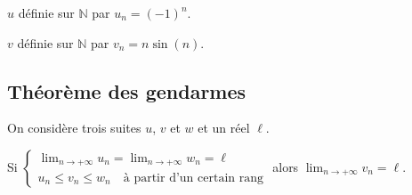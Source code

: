 \documentclass[french]{book}
\newcommand{\N}{\mathbb {N}}
\newcommand{\ie}{\leq}
\newcommand{\limn}{\lim_{n\rightarrow +\infty}}
\newcommand{\limpinf}[1][x]{\ds\lim_{#1\rightarrow +\infty}}
\begin{document}
\begin{exemple}
$u$ définie sur $\N$ par $u_{n}=(-1)^{n}$.

$v$ définie sur $\N$ par $v_{n}=n\sin(n)$.
\end{exemple}

\subsection{Théorème des gendarmes}

\begin{prop}
On considère trois suites $u$, $v$ et $w$ et un réel $\ell$.
\par Si \quad
$\left\{\begin{array}{l}
\limn u_{n}=\limn w_{n}=\ell \\
u_{n} \ie v_{n} \ie w_{n} \quad \text{à partir d'un certain rang}
\end{array}\right.
$
\qquad alors \quad $\limn v_{n}=\ell$.
\end{prop}
\end{document}
